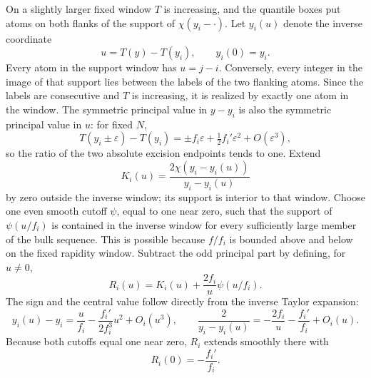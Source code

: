 On a slightly larger fixed window \(T\) is increasing, and the quantile boxes put atoms on both flanks of the support of \(\chi(y_i-\cdot)\). Let \(y_i(u)\) denote the inverse coordinate
\[
 u=T(y)-T(y_i),\qquad y_i(0)=y_i.
\]
Every atom in the support window has \(u=j-i\). Conversely, every integer in the image of that support lies between the labels of the two flanking atoms. Since the labels are consecutive and \(T\) is increasing, it is realized by exactly one atom in the window. The symmetric principal value in \(y-y_i\) is also the symmetric principal value in \(u\): for fixed \(N\),
\[
 T(y_i\pm\varepsilon)-T(y_i)
 =\pm f_i\varepsilon+\tfrac12f_i'\varepsilon^2+O(\varepsilon^3),
\]
so the ratio of the two absolute excision endpoints tends to one.
Extend
\[
 K_i(u)=\frac{2\chi(y_i-y_i(u))}{y_i-y_i(u)}
\]
by zero outside the inverse window; its support is interior to that window. Choose one even smooth cutoff \(\psi\), equal to one near zero, such that the support of \(\psi(u/f_i)\) is contained in the inverse window for every sufficiently large member of the bulk sequence. This is possible because \(f/f_i\) is bounded above and below on the fixed rapidity window. Subtract the odd principal part by defining, for \(u\ne0\),
\[
 R_i(u)=K_i(u)+\frac{2f_i}{u}\psi(u/f_i).
\]
The sign and the central value follow directly from the inverse Taylor expansion:
\[
 y_i(u)-y_i=\frac{u}{f_i}-\frac{f_i'}{2f_i^3}u^2+O_i(u^3),
 \qquad
 \frac2{y_i-y_i(u)}
 =-\frac{2f_i}{u}-\frac{f_i'}{f_i}+O_i(u).
\]
Because both cutoffs equal one near zero, \(R_i\) extends smoothly there with
\begin{equation}\label{eq:missing-central-value}
 R_i(0)=-\frac{f_i'}{f_i}.
\end{equation}


